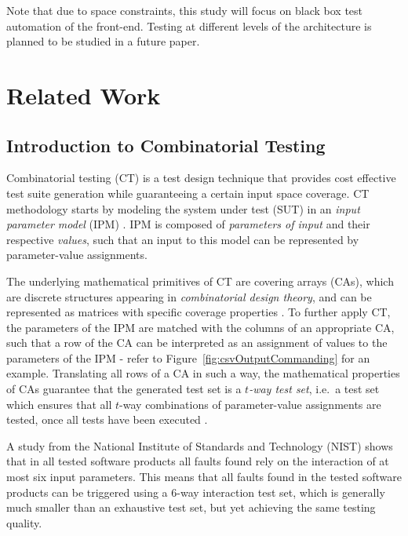 \documentclass[conference]{IEEEtran}
\begin{document}
Note that due to space constraints, this study will focus on black box test automation of the front-end. Testing at different levels of the architecture is planned to be studied in a future paper. 


\section{Related Work}

	\subsection{Introduction to Combinatorial Testing}
	Combinatorial testing (CT) is a test design technique that provides cost effective test suite generation
	while guaranteeing a certain input space coverage.
	CT methodology starts by modeling the system under test (SUT) in an \emph{input parameter model} (IPM) \cite{OffuttIPM}.
	IPM is composed of \emph{parameters of input} and their respective \emph{values},
	such that an input to this model can be represented by parameter-value assignments.
	
	The underlying mathematical primitives of CT are covering arrays (CAs), which are discrete structures appearing in \emph{combinatorial design theory},
	and can be represented as matrices with specific coverage properties \cite{NISTpractical}.
	To further apply CT, the parameters of the IPM are matched with the columns of an appropriate CA,
	such that a row of the CA can be interpreted as an assignment of values to the parameters of the IPM - refer to Figure~\ref{fig:csvOutputCommanding} for an example.
	Translating all rows of a CA in such a way, the mathematical properties of CAs guarantee that the generated test set
	is a \emph{$t$-way test set}, i.e.\ a test set which ensures that all $t$-way combinations of parameter-value assignments are tested,
	once all tests have been executed \cite{NISTpractical}.
	
	A study from the National Institute of Standards and Technology (NIST) \cite{NISTpractical} shows
	that in all tested software products all faults found rely on the interaction of at most six input parameters.
	This means that all faults found in the tested software products can be triggered using a $6$-way interaction test set,
	which is generally much smaller than an exhaustive test set, but yet achieving the same testing quality.
\end{document}
